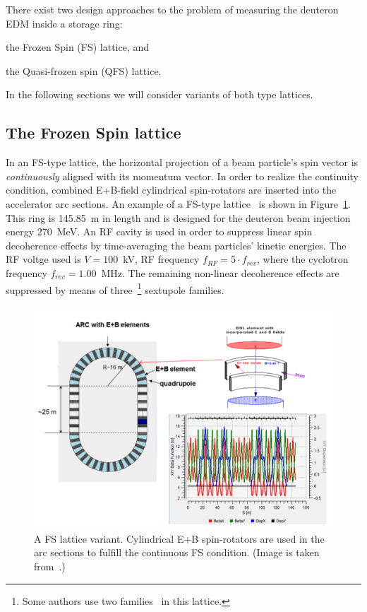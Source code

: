 
There exist two design approaches to the problem of measuring the deuteron EDM inside a storage ring:
\begin{enumerate*}[(i)]
	\item the Frozen Spin (FS) lattice, and
	\item the Quasi-frozen spin (QFS) lattice.
\end{enumerate*}

In the following sections we will consider variants of both type lattices.

\subsection{The Frozen Spin lattice} \label{chpt2:lattice:FS_BNL}
In an FS-type lattice, the horizontal projection of a beam particle's spin vector is 
\emph{continuously} aligned with its momentum vector. In order to realize the continuity condition, 
combined E+B-field cylindrical spin-rotators are inserted into the accelerator arc sections. 
An example of a FS-type lattice~\cite{Senichev:Lattices} is shown in Figure~\ref{fig:BNL_lattice}. 
This ring is 145.85~m in length and is designed for the deuteron beam injection energy 270~MeV. 
An RF cavity is used in order to suppress linear spin decoherence effects by time-averaging 
the beam particles' kinetic energies.
The RF voltge used is $V = 100$~kV, RF frequency $f_{RF} = 5\cdot f_{rev}$,
where the cyclotron frequency $f_{rev} = 1.00$~MHz. The remaining non-linear decoherence effects are
suppressed by means of three~\footnote{Some authors use two families~\cite{Eremey:Thesis} in this lattice.}
sextupole families.

\begin{figure}[h!]
	\centering
	\includegraphics[width=\linewidth]{images/chapter2/BNL_lattice}
	\caption{A FS lattice variant. Cylindrical E+B spin-rotators are used in the arc sections to fulfill
          the continuous FS condition. (Image is taken from~\cite{Senichev:Lattices}.)\label{fig:BNL_lattice}}
\end{figure}


